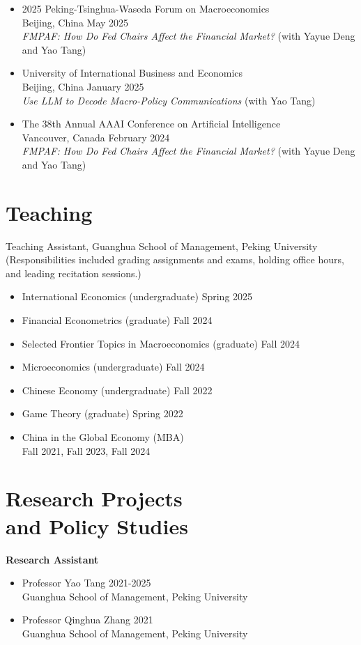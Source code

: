 \documentclass[margin]{res}
\begin{document}
\begin{resume}
\begin{itemize}
  \item 2025 Peking-Tsinghua-Waseda Forum on Macroeconomics\\
  Beijing, China \hfill May 2025\\
  \emph{FMPAF: How Do Fed Chairs Affect the Financial Market?} (with Yayue Deng and Yao Tang)

  \item University of International Business and Economics\\
  Beijing, China \hfill January 2025\\
  \emph{Use LLM to Decode Macro-Policy Communications} (with Yao Tang)

  \item The 38th Annual AAAI Conference on Artificial Intelligence\\
  Vancouver, Canada \hfill February 2024\\
  \emph{FMPAF: How Do Fed Chairs Affect the Financial Market?} (with Yayue Deng and Yao Tang)
\end{itemize}

\newpage
\section{Teaching}
Teaching Assistant, Guanghua School of Management, Peking University\\
(Responsibilities included grading assignments and exams, holding office hours, and leading recitation sessions.)
\begin{itemize} \itemsep -2pt
  \item International Economics (undergraduate) \hfill Spring 2025
  \item Financial Econometrics (graduate) \hfill Fall 2024
  \item Selected Frontier Topics in Macroeconomics (graduate) \hfill Fall 2024
  \item Microeconomics (undergraduate) \hfill Fall 2024
  \item Chinese Economy (undergraduate) \hfill Fall 2022
  \item Game Theory (graduate) \hfill Spring 2022
  \item China in the Global Economy (MBA)\\
  \mbox{}\hfill Fall 2021, Fall 2023, Fall 2024
\end{itemize}

\section{Research Projects\\and Policy Studies}
\textbf{Research Assistant}
\begin{itemize} \itemsep -2pt
  \item Professor Yao Tang \hfill 2021-2025\\
  Guanghua School of Management, Peking University
  \item Professor Qinghua Zhang \hfill 2021\\
  Guanghua School of Management, Peking University
\end{itemize}



\end{resume}
\end{document}
